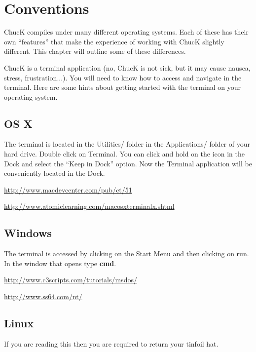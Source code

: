 \section{Conventions}

ChucK compiles under many different operating systems. Each of these has their own ``features'' that make the experience of working with ChucK slightly different. This chapter will outline some of these differences. 

ChucK is a terminal application (no, ChucK is not sick, but it may cause nausea, stress, frustration...). You will need to know how to access and navigate in the terminal. Here are some hints about getting started with the terminal on your operating system.


\subsection{OS X}

The terminal is located in the Utilities/ folder in the Applications/ folder of your hard drive. Double click on Terminal. You can click and hold on the icon in the Dock and select the ``Keep in Dock'' option. Now the Terminal application will be conveniently located in the Dock. 

\href{http://www.macdevcenter.com/pub/ct/51}{http://www.macdevcenter.com/pub/ct/51}

\href{http://www.atomiclearning.com/macosxterminalx.shtml}{http://www.atomiclearning.com/macosxterminalx.shtml}

\subsection{Windows}

The terminal is accessed by clicking on the Start Menu and then clicking on run. In the window that opens type {\bf cmd}. 

\href{http://www.c3scripts.com/tutorials/msdos/}{http://www.c3scripts.com/tutorials/msdos/}

\href{http://www.ss64.com/nt/}{http://www.ss64.com/nt/}

\subsection{Linux}

If you are reading this then you are required to return your tinfoil hat.
